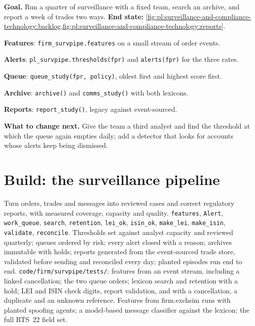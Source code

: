 \begin{tutorial}
\textbf{Goal.} Run a quarter of surveillance with a fixed team, search an archive, and report a week of trades two ways.
\textbf{End state:} \cref{fig:pl:surveillance-and-compliance-technology:backlog,fig:pl:surveillance-and-compliance-technology:reports}.
\begin{tutsteps}
\item \textbf{Features}: \texttt{firm\_survpipe.features} on a small stream of order events.
\item \textbf{Alerts}: \texttt{pl\_survpipe.thresholds(fpr)} and \texttt{alerts(fpr)} for the three rates.
\item \textbf{Queue}: \texttt{queue\_study(fpr, policy)}, oldest first and highest score first.
\item \textbf{Archive}: \texttt{archive()} and \texttt{comms\_study()} with both lexicons.
\item \textbf{Reports}: \texttt{report\_study()}, legacy against event-sourced.
\end{tutsteps}
\textbf{What to change next.} Give the team a third analyst and find the threshold at which the queue again empties daily; add a detector
that looks for accounts whose alerts keep being dismissed.
\end{tutorial}

\section{Build: the surveillance pipeline}\label{bld:pl:surveillance-and-compliance-technology:survpipe}

\begin{build}
 Turn orders, trades and messages into reviewed cases and correct regulatory reports, with measured coverage, capacity and
quality.
 \texttt{features}, \texttt{Alert}, \texttt{work\_queue}, \texttt{search}, \texttt{retention}, \texttt{lei\_ok},
\texttt{isin\_ok}, \texttt{make\_lei}, \texttt{make\_isin}, \texttt{validate}, \texttt{reconcile}.
 Thresholds set against analyst capacity and reviewed quarterly; queues ordered by risk; every alert closed with a reason;
archives immutable with holds; reports generated from the event-sourced trade store, validated before sending and reconciled every day;
planted episodes run end to end.
 \texttt{code/firm/survpipe/tests/}: features from an event stream, including a linked cancellation; the two queue
orders; lexicon search and retention with a hold; LEI and ISIN check digits, report validation, and  with a cancellation, a
duplicate and an unknown reference.
 Features from firm.exchsim runs with planted spoofing agents; a model-based message classifier against the lexicon; the
full RTS~22 field set.
\end{build}

